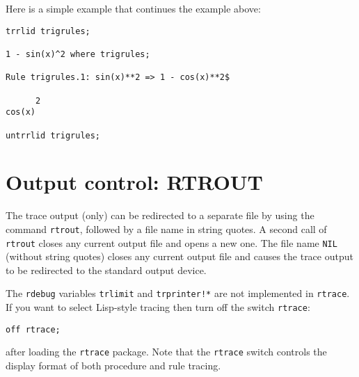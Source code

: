 \documentclass[11pt,a4paper]{article}
\newcommand{\rdebug}{\texttt{rdebug}}
\newcommand{\rtrace}{\texttt{rtrace}}
\begin{document}
Here is a simple example that continues the example above:
\begin{verbatim}
trrlid trigrules;

1 - sin(x)^2 where trigrules;

Rule trigrules.1: sin(x)**2 => 1 - cos(x)**2$

      2
cos(x)

untrrlid trigrules;
\end{verbatim}

\section{Output control: RTROUT}

The trace output (only) can be redirected to a separate file by using
the command \texttt{rtrout}, followed by a file name in string quotes.
A second call of \texttt{rtrout} closes any current output file and
opens a new one.  The file name \texttt{NIL} (without string quotes)
closes any current output file and causes the trace output to be
redirected to the standard output device.

The \rdebug{} variables \texttt{trlimit} and \texttt{trprinter!*} are
not implemented in \rtrace{}.  If you want to select Lisp-style
tracing then turn off the switch \rtrace{}:
\begin{verbatim}
off rtrace;
\end{verbatim}
after loading the \rtrace{} package.  Note that the \rtrace{} switch
controls the display format of both procedure and rule tracing.
\end{document}
